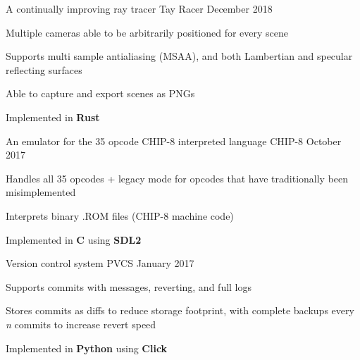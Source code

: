 

\begin{cventries}
    \cventry
    {A continually improving ray tracer} %
    {Tay Racer} %
    {}{December 2018}{
        \begin{cvitems} %
            \item {Multiple cameras able to be arbitrarily positioned for every scene}
            \item {Supports multi sample antialiasing (MSAA), and both Lambertian and specular reflecting surfaces}
            \item {Able to capture and export scenes as PNGs}
            \item {Implemented in \textbf{Rust}}
        \end{cvitems}
    }

    \cventry
    {An emulator for the 35 opcode CHIP-8 interpreted language} %
    {CHIP-8} %
    {}{October 2017}{
        \begin{cvitems} %
            \item {Handles all 35 opcodes + legacy mode for opcodes that have traditionally been misimplemented}
            \item {Interprets binary .ROM files (CHIP-8 machine code)}
            \item {Implemented in \textbf{C} using \textbf{SDL2}}
        \end{cvitems}
    }

    \cventry
    {Version control system} %
    {PVCS} %
    {}{January 2017}{
        \begin{cvitems} %
            \item {Supports commits with messages, reverting, and full logs}
            \item {Stores commits as diffs to reduce storage footprint, with complete backups every \textit{n} commits to increase revert speed}
            \item {Implemented in \textbf{Python} using \textbf{Click}}
        \end{cvitems}
    }


\end{cventries}
